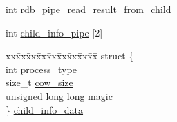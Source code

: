 \begin{DoxyCompactItemize}
\item 
int \hyperlink{structredis_server_a54523a05033d32457238dbf95154f6fa}{rdb\+\_\+pipe\+\_\+read\+\_\+result\+\_\+from\+\_\+child}
\item 
int \hyperlink{structredis_server_a03c39bc68938b334e9c4722f34ca097d}{child\+\_\+info\+\_\+pipe} \mbox{[}2\mbox{]}
\item 
\begin{tabbing}
xx\=xx\=xx\=xx\=xx\=xx\=xx\=xx\=xx\=\kill
struct \{\\
\>int \hyperlink{structredis_server_ac9eff851ad156de1a36494a5e5b3ae8d}{process\_type}\\
\>size\_t \hyperlink{structredis_server_abf5f3ab99224e13f1b05690ba42216ca}{cow\_size}\\
\>unsigned long long \hyperlink{structredis_server_a08654d4e800966822ca48a08cf86deac}{magic}\\
\} \hyperlink{structredis_server_aa96405b85d2082e0f231cb462e821a54}{child\_info\_data}\\


\end{tabbing}
\end{DoxyCompactItemize}
